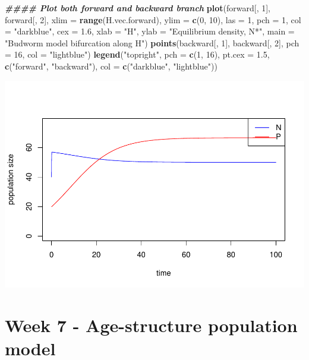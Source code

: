 \documentclass[
]{book}
\newenvironment{Shaded}{\begin{snugshade}}{\end{snugshade}}
\newcommand{\AttributeTok}[1]{\textcolor[rgb]{0.13,0.29,0.53}{#1}}
\newcommand{\DecValTok}[1]{\textcolor[rgb]{0.00,0.00,0.81}{#1}}
\newcommand{\DocumentationTok}[1]{\textcolor[rgb]{0.56,0.35,0.01}{\textbf{\textit{#1}}}}
\newcommand{\FloatTok}[1]{\textcolor[rgb]{0.00,0.00,0.81}{#1}}
\newcommand{\FunctionTok}[1]{\textcolor[rgb]{0.13,0.29,0.53}{\textbf{#1}}}
\newcommand{\NormalTok}[1]{#1}
\newcommand{\StringTok}[1]{\textcolor[rgb]{0.31,0.60,0.02}{#1}}
\begin{document}
\begin{Shaded}
\begin{Highlighting}[]
\DocumentationTok{\#\#\#\# Plot both forward and backward branch}
\FunctionTok{plot}\NormalTok{(forward[, }\DecValTok{1}\NormalTok{], forward[, }\DecValTok{2}\NormalTok{],}
     \AttributeTok{xlim =} \FunctionTok{range}\NormalTok{(H.vec.forward), }\AttributeTok{ylim =} \FunctionTok{c}\NormalTok{(}\DecValTok{0}\NormalTok{, }\DecValTok{10}\NormalTok{), }\AttributeTok{las =} \DecValTok{1}\NormalTok{, }\AttributeTok{pch =} \DecValTok{1}\NormalTok{, }\AttributeTok{col =} \StringTok{"darkblue"}\NormalTok{, }\AttributeTok{cex =} \FloatTok{1.6}\NormalTok{,}
     \AttributeTok{xlab =} \StringTok{"H"}\NormalTok{, }\AttributeTok{ylab =} \StringTok{"Equilibrium density, N*"}\NormalTok{, }\AttributeTok{main =} \StringTok{"Budworm model bifurcation along H"}\NormalTok{)}
\FunctionTok{points}\NormalTok{(backward[, }\DecValTok{1}\NormalTok{], backward[, }\DecValTok{2}\NormalTok{], }\AttributeTok{pch =} \DecValTok{16}\NormalTok{, }\AttributeTok{col =} \StringTok{"lightblue"}\NormalTok{)}
\FunctionTok{legend}\NormalTok{(}\StringTok{"topright"}\NormalTok{, }\AttributeTok{pch =} \FunctionTok{c}\NormalTok{(}\DecValTok{1}\NormalTok{, }\DecValTok{16}\NormalTok{), }\AttributeTok{pt.cex =} \FloatTok{1.5}\NormalTok{, }\FunctionTok{c}\NormalTok{(}\StringTok{"forward"}\NormalTok{, }\StringTok{"backward"}\NormalTok{),}
       \AttributeTok{col =} \FunctionTok{c}\NormalTok{(}\StringTok{"darkblue"}\NormalTok{, }\StringTok{"lightblue"}\NormalTok{))}
\end{Highlighting}
\end{Shaded}

\includegraphics{bookdown-demo_files/figure-latex/unnamed-chunk-31-1.pdf}

\hypertarget{week-7---age-structure-population-model}{%
\chapter*{Week 7 - Age-structure population model}\label{week-7---age-structure-population-model}}
\end{document}
